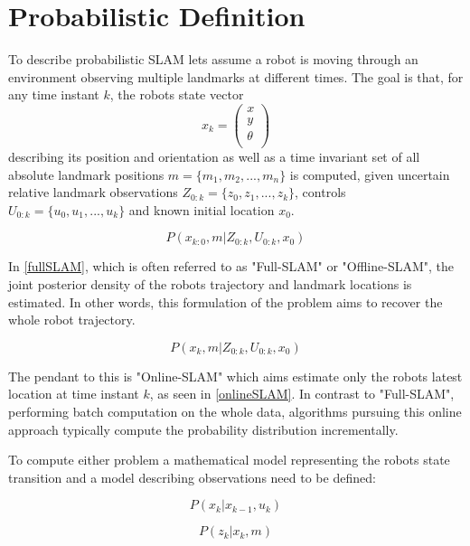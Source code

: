 \section{Probabilistic Definition}
To describe probabilistic SLAM lets assume a robot is moving through an environment observing multiple landmarks at different times. 
The goal is that, for any time instant $ k $, the robots state vector 
\[ x_{k} = 
\begin{pmatrix}
	x \\
	y \\
	\theta \\
\end{pmatrix}
\] describing its position and orientation as well as a time invariant set of all absolute landmark positions 
$ m = \{ m_{1}, m_{2}, ..., m_{n} \}$ 
is computed, given uncertain relative landmark observations $ Z_{0:k} = \{z_{0}, z_{1}, ..., z_{k}\}$, controls $ U_{0:k} = \{u_{0}, u_{1}, ..., u_{k}\}$ and known initial location $ x_{0} $.

\begin{equation}\label{fullSLAM}
	P(x_{k:0}, m | Z_{0:k}, U_{0:k}, x_{0})
\end{equation}

In \ref{fullSLAM}, which is often referred to as "Full-SLAM" or "Offline-SLAM", the joint posterior density of the robots trajectory and landmark locations is estimated. In other words, this formulation of the problem aims to recover the whole robot trajectory.

\begin{equation}\label{onlineSLAM}
	P(x_{k}, m | Z_{0:k}, U_{0:k}, x_{0})
\end{equation}

The pendant to this is "Online-SLAM" which aims estimate only the robots latest location at time instant $ k $, as seen in \ref{onlineSLAM}. In contrast to "Full-SLAM", performing batch computation on the whole data, algorithms pursuing this online approach typically compute the probability distribution incrementally. 

To compute either problem a mathematical model representing the robots state transition and a model describing observations need to be defined:

\begin{equation}\label{motionModel}
	P(x_{k} | x_{k-1}, u_{k})
\end{equation}

\begin{equation}\label{observationModel}
	P(z_{k} | x_{k}, m)
\end{equation}

